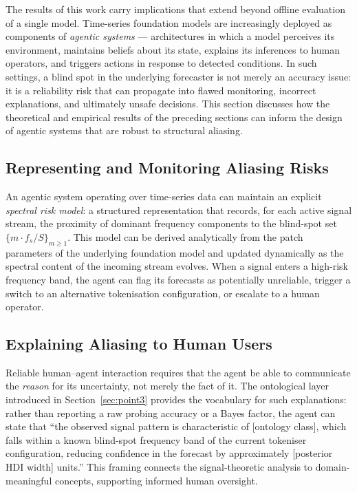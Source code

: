 The results of this work carry implications that extend beyond offline evaluation of a single model.
Time-series foundation models are increasingly deployed as components of \emph{agentic systems} — architectures in which a model perceives its environment, maintains beliefs about its state, explains its inferences to human operators, and triggers actions in response to detected conditions.
In such settings, a blind spot in the underlying forecaster is not merely an accuracy issue: it is a reliability risk that can propagate into flawed monitoring, incorrect explanations, and ultimately unsafe decisions.
This section discusses how the theoretical and empirical results of the preceding sections can inform the design of agentic systems that are robust to structural aliasing.

\subsection{Representing and Monitoring Aliasing Risks}

An agentic system operating over time-series data can maintain an explicit \emph{spectral risk model}: a structured representation that records, for each active signal stream, the proximity of dominant frequency components to the blind-spot set $\{m \cdot f_s / S\}_{m \geq 1}$.
This model can be derived analytically from the patch parameters of the underlying foundation model and updated dynamically as the spectral content of the incoming stream evolves.
When a signal enters a high-risk frequency band, the agent can flag its forecasts as potentially unreliable, trigger a switch to an alternative tokenisation configuration, or escalate to a human operator.

\subsection{Explaining Aliasing to Human Users}

Reliable human–agent interaction requires that the agent be able to communicate the \emph{reason} for its uncertainty, not merely the fact of it.
The ontological layer introduced in Section~\ref{sec:point3} provides the vocabulary for such explanations: rather than reporting a raw probing accuracy or a Bayes factor, the agent can state that ``the observed signal pattern is characteristic of [ontology class], which falls within a known blind-spot frequency band of the current tokeniser configuration, reducing confidence in the forecast by approximately [posterior HDI width] units.''
This framing connects the signal-theoretic analysis to domain-meaningful concepts, supporting informed human oversight.

